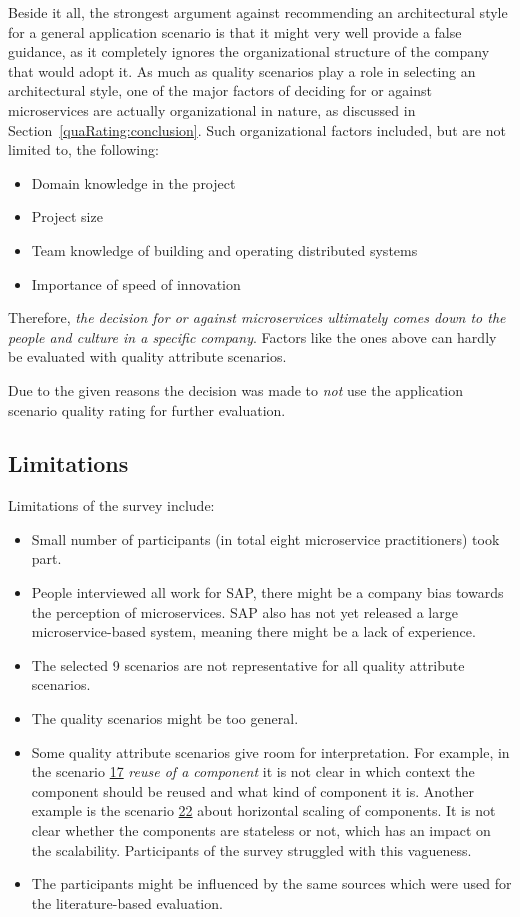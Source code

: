 Beside it all, the strongest argument against recommending an architectural style for a general application scenario is that it might very well provide a false guidance, as it completely ignores the organizational structure of the company that would adopt it.
As much as quality scenarios play a role in selecting an architectural style, one of the major factors of deciding for or against microservices are actually organizational in nature, as discussed in Section~\ref{quaRating:conclusion}.
Such organizational factors included, but are not limited to, the following:
\begin{itemize}
\item Domain knowledge in the project
\item Project size
\item Team knowledge of building and operating distributed systems
\item Importance of speed of innovation
\end{itemize}
Therefore, \textit{the decision for or against microservices ultimately comes down to the people and culture in a specific company}.
Factors like the ones above can hardly be evaluated with quality attribute scenarios.

Due to the given reasons the decision was made to \textit{not} use the application scenario quality rating for further evaluation.

\subsection{Limitations} 
Limitations of the survey include:
\begin{itemize}
\item Small number of participants (in total eight microservice practitioners) took part.
\item People interviewed all work for SAP, there might be a company bias towards the perception of microservices. SAP also has not yet released a large microservice-based system, meaning there might be a lack of experience.
\item The selected 9 scenarios are not representative for all quality attribute scenarios.
\item The quality scenarios might be too general.
\item Some quality attribute scenarios give room for interpretation. For example,
 in the scenario \hyperref[quaMicro:s17]{17} \textit{reuse of a component} it is not clear in which context the component should be reused and what kind of component it is. Another example is the scenario \hyperref[quaMicro:s22]{22} about horizontal scaling of components. It is not clear whether the components are stateless or not, which has an impact on the scalability. Participants of the survey struggled with this vagueness.
\item The participants might be influenced by the same sources which were used for the literature-based evaluation.
\end{itemize}

